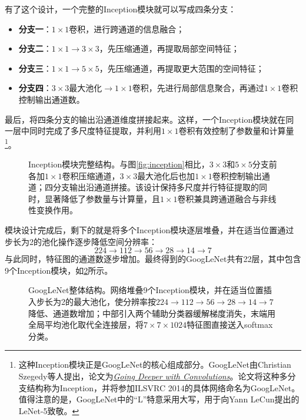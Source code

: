 有了这个设计，一个完整的Inception模块就可以写成四条分支：
\begin{itemize}
    \item \textbf{分支一}：$1\times1$卷积，进行跨通道的信息融合；
    \item \textbf{分支二}：$1\times1\to3\times3$，先压缩通道，再提取局部空间特征；
    \item \textbf{分支三}：$1\times1\to5\times5$，先压缩通道，再提取更大范围的空间特征；
    \item \textbf{分支四}：$3\times3$最大池化$\to1\times1$卷积，先进行局部信息聚合，再通过$1\times1$卷积控制输出通道数。
\end{itemize}
最后，将四条分支的输出沿通道维度拼接起来。这样，一个Inception模块就在同一层中同时完成了多尺度特征提取，并利用$1\times1$卷积有效控制了参数量和计算量\footnote{这种Inception模块正是GoogLeNet的核心组成部分。GoogLeNet由Christian Szegedy等人提出，论文为\href{https://www.cv-foundation.org/openaccess/content_cvpr_2015/papers/Szegedy_Going_Deeper_With_2015_CVPR_paper.pdf}{\textit{Going Deeper with Convolutions}}。论文将这种多分支结构称为Inception，并将参加ILSVRC 2014的具体网络命名为GoogLeNet。值得注意的是，GoogLeNet中的“L”特意采用大写，用于向Yann LeCun提出的LeNet-5致敬。}。

\begin{figure}[H]
    \caption{Inception模块完整结构。与图\ref{fig:inception}相比，$3\times3$和$5\times5$分支前各加$1\times1$卷积压缩通道，$3\times3$最大池化后也加$1\times1$卷积控制输出通道；四分支输出沿通道拼接。该设计保持多尺度并行特征提取的同时，显著降低了参数量与计算量，且$1\times1$卷积兼具跨通道融合与非线性变换作用。}
    \label{fig:inception_module}
\end{figure}

模块设计完成后，剩下的就是将多个Inception模块逐层堆叠，并在适当位置通过步长为2的池化操作逐步降低空间分辨率：
\[
224\to112\to56\to28\to14\to7
\]
与此同时，特征图的通道数逐步增加。最终得到的GoogLeNet共有22层，其中包含9个Inception模块，如\cref{fig:googlenet}所示。

\begin{figure}[H]
    \caption{GoogLeNet整体结构。网络堆叠9个Inception模块，并在适当位置插入步长为2的最大池化，使分辨率按$224\to112\to56\to28\to14\to7$降低、通道数增加；中部引入两个辅助分类器缓解梯度消失，末端用全局平均池化取代全连接层，将$7\times7\times1024$特征图直接送入softmax分类。}
    \label{fig:googlenet}
\end{figure}

